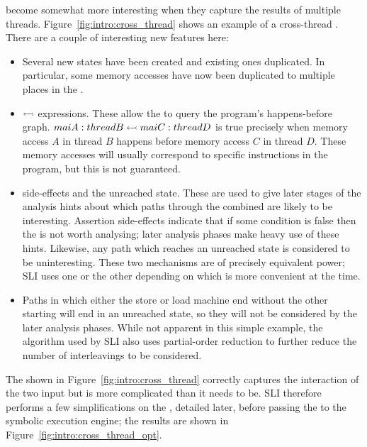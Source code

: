 \STateMachines become somewhat more interesting when they capture the
results of multiple threads.  Figure~\ref{fig:intro:cross_thread}
shows an example of a cross-thread \StateMachine.  There are a couple
of interesting new features here:

\begin{itemize}
\item Several new states have been created and existing ones
  duplicated.  In particular, some memory accesses have now been
  duplicated to multiple places in the \StateMachine.
\item
  $\leftarrowtail$ expressions.  These allow the {\StateMachine} to
  query the program's happens-before graph.  $maiA:threadB
  \leftarrowtail maiC:threadD$ is true precisely when memory access
  $A$ in thread $B$ happens before memory access $C$ in thread $D$.
  These memory accesses will usually correspond to specific
  instructions in the program, but this is not guaranteed.
\item
   side-effects and the unreached state.  These are used to
  give later stages of the analysis hints about which paths through
  the combined {\StateMachine} are likely to be interesting.  Assertion
  side-effects indicate that if some condition is false then the
  {\StateMachine} is not worth analysing; later analysis phases make
  heavy use of these hints.  Likewise, any path which reaches an
  unreached state is considered to be uninteresting.  These two
  mechanisms are of precisely equivalent power; SLI uses one or the
  other depending on which is more convenient at the time.
\item
  Paths in which either the store or load machine end
  without the other starting will end in an unreached state, so they
  will not be considered by the later analysis phases.  While not
  apparent in this simple example, the algorithm used by SLI also uses
  partial-order reduction\needCite{} to further reduce the number of
  interleavings to be considered.
\end{itemize}

The {\StateMachine} shown in Figure~\ref{fig:intro:cross_thread}
correctly captures the interaction of the two input \StateMachines but
is more complicated than it needs to be.  SLI therefore performs a few
simplifications on the \StateMachine, detailed later, before passing
the {\StateMachine} to the symbolic execution engine; the results are
shown in Figure~\ref{fig:intro:cross_thread_opt}.


